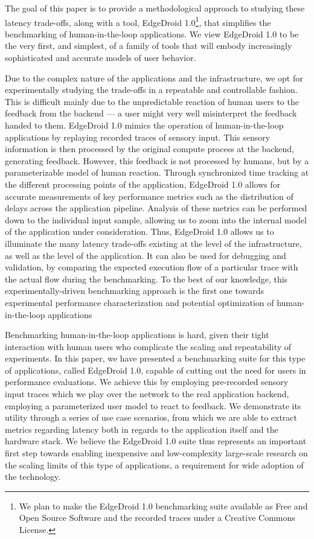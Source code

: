 The goal of this paper is to provide a methodological approach to studying these latency trade-offs, along with a tool, EdgeDroid 1.0\footnote{We plan to make the EdgeDroid 1.0 benchmarking suite available as Free and Open Source Software and the recorded traces under a Creative Commons License.}, that simplifies the benchmarking of human-in-the-loop applications.
We view EdgeDroid 1.0 to be the very first, and simplest, of a family of tools that will embody increasingly sophisticated and accurate models of user behavior.

Due to the complex nature of the applications and the infrastructure, we opt for experimentally studying the trade-offs in a repeatable and controllable fashion.
This is difficult mainly due to the unpredictable reaction of human users to the feedback from the backend --- a user might very well misinterpret the feedback handed to them.
EdgeDroid 1.0 mimics the operation of human-in-the-loop applications by replaying recorded traces of sensory input.
This sensory information is then processed by the original compute process at the backend, generating feedback.
However, this feedback is not processed by humans, but by a parameterizable model of human reaction.
Through synchronized time tracking at the different processing points of the application, EdgeDroid 1.0 allows for accurate measurements of key performance metrics such as the distribution of delays across the application pipeline.
Analysis of these metrics can be performed down to the individual input sample, allowing us to zoom into the internal model of the application under consideration.
Thus, EdgeDroid 1.0 allows us to illuminate the many latency trade-offs existing at the level of the infrastructure, as well as the level of the application.
It can also be used for debugging and validation, by comparing the expected execution flow of a particular trace with the actual flow during the benchmarking.
To the best of our knowledge, this experimentally-driven benchmarking approach is the first one towards experimental performance characterization and potential optimization of human-in-the-loop applications

Benchmarking human-in-the-loop applications is hard, given their tight interaction with human users who complicate the scaling and repeatability of experiments.
In this paper, we have presented a benchmarking suite for this type of applications, called EdgeDroid 1.0, capable of cutting out the need for users in performance evaluations.
We achieve this by employing pre-recorded sensory input traces which we play over the network to the real application backend, employing a parameterized user model to react to feedback.
We demonstrate its utility through a series of use case scenarios, from which we are able to extract metrics regarding latency both in regards to the application itself and the hardware stack.
We believe the EdgeDroid 1.0 suite thus represents an important first step towards enabling inexpensive and low-complexity large-scale research on the scaling limits of this type of applications, a requirement for wide adoption of the technology.

